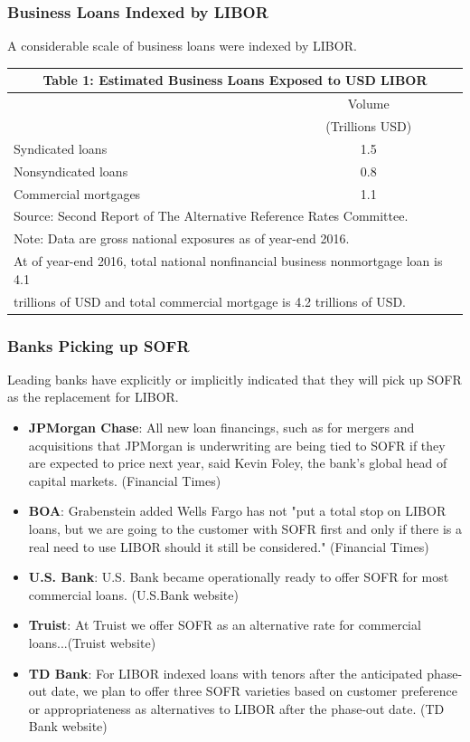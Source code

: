 \documentclass[10pt]{beamer}
\begin{document}
\begin{frame}
  \frametitle{Business Loans Indexed by LIBOR}
  A considerable scale of business loans were indexed by LIBOR.
  \begin{center}
  {\footnotesize%
  \begin{tabular}{lc}
  \multicolumn{2}{c}{Table 1: Estimated Business Loans Exposed to USD LIBOR}\\\hline
   &Volume \\ 
   &(Trillions USD)  \\ \hline
   Syndicated loans & 1.5 \\
   Nonsyndicated loans & 0.8  \\
   Commercial mortgages & 1.1  \\
   \hline \hline
  \multicolumn{2}{l}{ Source: Second Report of The Alternative Reference Rates Committee.} \\
  \multicolumn{2}{l}{Note: Data are gross national exposures as of year-end 2016.  }\\
  \multicolumn{2}{l}{\hspace{7mm} At of year-end 2016,  total national nonfinancial business nonmortgage loan is 4.1} \\ 
  \multicolumn{2}{l}{\hspace{7mm} trillions of USD and total commercial mortgage is 4.2 trillions of USD. }
  \end{tabular}
  }%
  \end{center}
  \end{frame}
  

  
  \begin{frame}
  \frametitle{Banks Picking up SOFR}
  Leading banks have explicitly or implicitly indicated that they will pick up SOFR as the replacement for LIBOR.
  \begin{itemize}
  \item \textbf{JPMorgan Chase}: All new loan financings, such as for mergers and acquisitions that JPMorgan is underwriting are being tied to SOFR if they are expected to price next year, said Kevin Foley, the bank's global head of capital markets. (Financial Times)
  \item \textbf{BOA}: Grabenstein added Wells Fargo has not "put a total stop on LIBOR loans, but we are going to the customer with SOFR first and only if there is a real need to use LIBOR should it still be considered." (Financial Times)
  \item \textbf{U.S.  Bank}: U.S. Bank became operationally ready to offer SOFR for most commercial loans.  (U.S.Bank website)
  \item \textbf{Truist}: At Truist we offer SOFR as an alternative rate for commercial loans...(Truist website)
  \item \textbf{TD Bank}: For LIBOR indexed loans with tenors after the anticipated phase-out date, we plan to offer three SOFR varieties based on customer preference or appropriateness as alternatives to LIBOR after the phase-out date.  (TD Bank website)
  \end{itemize}
  \end{frame}
  
\end{document}
